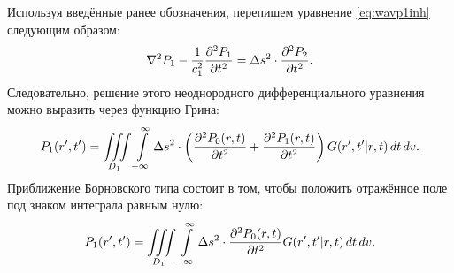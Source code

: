 \documentclass[a4paper, fontsize=14pt]{article}
\begin{document}
	Используя введённые ранее обозначения, перепишем уравнение \ref{eq:wavp1inh} следующим образом:
	\begin{equation}
		\nabla^2 P_1 - \frac{1}{c_1^2}\diff[2]{P_1}{t}  = \Delta s^2 \cdot \diff[2]{P_2}{t}.
	\end{equation}
	Следовательно, решение этого неоднородного дифференциального уравнения можно выразить через функцию Грина:
	\begin{equation}
		P_1(r',t')   = \iiint\limits_{D_1} \int\limits_{-\infty}^{\infty} \Delta s^2 \cdot \left(\diff[2]{P_0(r,t)}{t}+\diff[2]{P_1(r,t)}{t}\right) G(r',t'|r,t)\, dt \, dv.
	\end{equation}
	Приближение Борновского типа состоит в том, чтобы положить отражённое поле под знаком интеграла равным нулю:
	\begin{equation}
		P_1(r',t')   = \iiint\limits_{D_1} \int\limits_{-\infty}^{\infty} \Delta s^2 \cdot 	\diff[2]{P_0(r,t)}{t} G(r',t'|r,t)\, dt \, dv.
	\end{equation}
\end{document}
